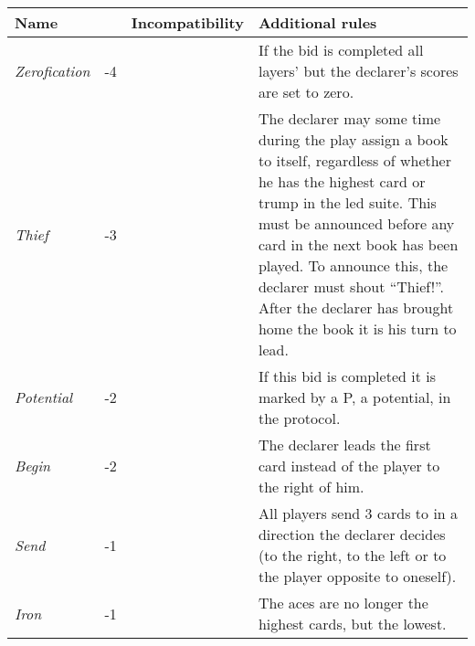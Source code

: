 %
%
%

\begin{table}
	\begin{center}
		\scriptsize {
			\begin{tabularx}{\textwidth}{ lcX | p{6cm} }
					\textbf{Name} & \rotccw{\textbf{Worth}} & {\textbf{Incompatibility}} & \textbf{Additional rules}
					\\ \hline
					
					\textit{Zerofication} & -4 &
					&
					If the bid is completed all layers' but the declarer's scores are set to zero.
					\\ \hline
					
					\textit{Thief} & -3 &
					&
					The declarer may some time during the play assign a book to itself, regardless of whether he has the highest card or trump in the led suite. This must be announced before any card in the next book has been played. To announce this, the declarer must shout ``Thief!''. After the declarer has brought home the book it is his turn to lead.
					\\ \hline
					
					\textit{Potential} & -2 &
					&
					If this bid is completed it is marked by a P, a potential, in the protocol.
					\\ \hline
					
					\textit{Begin} & -2 &
					&
					The declarer leads the first card instead of the player to the right of him.
					\\ \hline
					
					\textit{Send} & -1 &
					&
					All players send 3 cards to in a direction the declarer decides (to the right, to the left or to the player opposite to oneself).
					\\ \hline
					
					\textit{Iron} & -1 &
					&
					The aces are no longer the highest cards, but the lowest.
					\\ \hline
					

\end{tabularx}}
\end{center}
\end{table}
